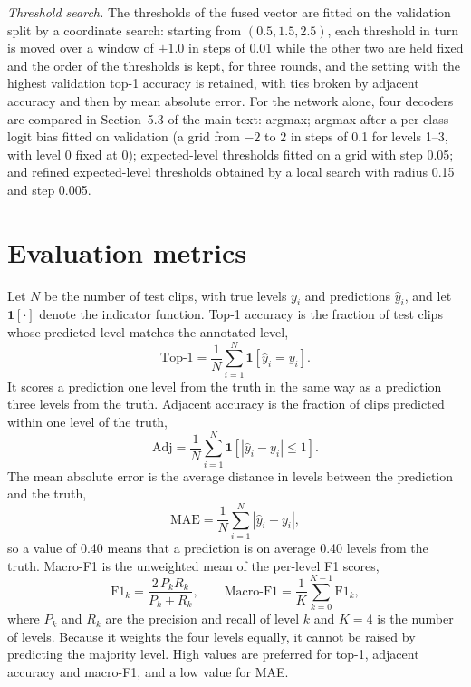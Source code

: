 \documentclass[pdflatex,sn-basic]{sn-jnl}
\begin{document}
\emph{Threshold search.} The thresholds of the fused vector are fitted on the validation split by a coordinate search: starting from $(0.5, 1.5, 2.5)$, each threshold in turn is moved over a window of $\pm 1.0$ in steps of 0.01 while the other two are held fixed and the order of the thresholds is kept, for three rounds, and the setting with the highest validation top-1 accuracy is retained, with ties broken by adjacent accuracy and then by mean absolute error. For the network alone, four decoders are compared in Section~5.3 of the main text: argmax; argmax after a per-class logit bias fitted on validation (a grid from $-2$ to $2$ in steps of 0.1 for levels 1--3, with level 0 fixed at 0); expected-level thresholds fitted on a grid with step 0.05; and refined expected-level thresholds obtained by a local search with radius 0.15 and step 0.005.

\section{Evaluation metrics}\label{sec:s_metrics}

Let $N$ be the number of test clips, with true levels $y_i$ and predictions $\hat{y}_i$, and let $\mathbf{1}[\cdot]$ denote the indicator function. Top-1 accuracy is the fraction of test clips whose predicted level matches the annotated level,
\begin{equation}
\mathrm{Top\text{-}1} = \frac{1}{N} \sum_{i=1}^{N} \mathbf{1}[\hat{y}_i = y_i].
\label{eq:s_top1}
\end{equation}
It scores a prediction one level from the truth in the same way as a prediction three levels from the truth. Adjacent accuracy is the fraction of clips predicted within one level of the truth,
\begin{equation}
\mathrm{Adj} = \frac{1}{N} \sum_{i=1}^{N} \mathbf{1}[|\hat{y}_i - y_i| \leq 1].
\label{eq:s_adj}
\end{equation}
The mean absolute error is the average distance in levels between the prediction and the truth,
\begin{equation}
\mathrm{MAE} = \frac{1}{N} \sum_{i=1}^{N} |\hat{y}_i - y_i|,
\label{eq:s_mae}
\end{equation}
so a value of 0.40 means that a prediction is on average 0.40 levels from the truth. Macro-F1 is the unweighted mean of the per-level F1 scores,
\begin{equation}
\mathrm{F1}_k = \frac{2\,P_k R_k}{P_k + R_k}, \qquad \mathrm{Macro\text{-}F1} = \frac{1}{K} \sum_{k=0}^{K-1} \mathrm{F1}_k,
\label{eq:s_f1}
\end{equation}
where $P_k$ and $R_k$ are the precision and recall of level $k$ and $K = 4$ is the number of levels. Because it weights the four levels equally, it cannot be raised by predicting the majority level. High values are preferred for top-1, adjacent accuracy and macro-F1, and a low value for MAE.
\end{document}

